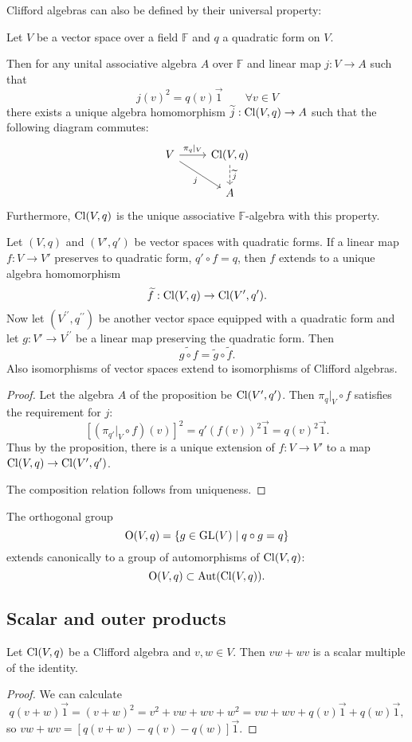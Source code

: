 Clifford algebras can also be defined by their universal property:
\begin{proposition} \label{CliffordUniversalProperty}
Let $V$ be a vector space over a field $\mathbb{F}$ and $q$ a quadratic form on $V$. 

Then for any unital associative algebra $A$ over $\mathbb{F}$ and linear map $j: V \to A$ such that
\[ j(v)^2 = q (v) \vec{1} \qquad \forall v\in V \]
there exists a unique algebra homomorphism $\widetilde{j}: \operatorname{Cl}(V,q)\to A$ such that the following diagram commutes:
\[ \begin{tikzcd}
V \rar{\pi_q|_V} \ar[dr, swap, "{j}"] & \Cl(V,q) \dar[dashed]{\widetilde{j}} \\
 & A
\end{tikzcd} \]
Furthermore, $\operatorname{Cl}(V,q)$ is the unique associative $\mathbb{F}$-algebra with this property.
\end{proposition}
\begin{corollary}
Let $(V,q)$ and $(V',q')$ be vector spaces with quadratic forms. If a linear map $f:V\to V'$ preserves to quadratic form, $q'\circ f = q$, then $f$ extends to a unique algebra homomorphism
\[ \widetilde{f}: \operatorname{Cl}(V,q) \to \operatorname{Cl}(V',q'). \]
Now let $(V^{\prime\prime},q^{\prime\prime})$ be another vector space equipped with a quadratic form and let $g: V'\to V^{\prime\prime}$ be a linear map preserving the quadratic form. Then
\[ \widetilde{g\circ f} = \widetilde{g}\circ\widetilde{f}. \]
Also isomorphisms of vector spaces extend to isomorphisms of Clifford algebras.
\end{corollary}
\begin{proof}
Let the algebra $A$ of the proposition be $\operatorname{Cl}(V',q')$. Then $\pi_q|_V\circ f$ satisfies the requirement for $j$:
\[ [(\pi_{q'}|_V\circ f)(v)]^2 = q'(f(v))^2 \vec{1} = q(v)^2\vec{1}. \]
Thus by the proposition, there is a unique extension of $f:V\to V'$ to a map $\operatorname{Cl}(V,q) \to \operatorname{Cl}(V',q')$.

The composition relation follows from uniqueness.
\end{proof}
\begin{corollary} \label{qOrthogonalMaps}
The orthogonal group
\[ \operatorname{O}(V,q) = \left\{ g\in\operatorname{GL}(V) \;\middle|\; q\circ g = q \right\} \]
extends canonically to a group of automorphisms of $\operatorname{Cl}(V,q)$:
\[ \operatorname{O}(V,q) \subset \operatorname{Aut}(\operatorname{Cl}(V,q)). \]
\end{corollary}


\subsection{Scalar and outer products}
\begin{lemma}
Let $\operatorname{Cl}(V,q)$ be a Clifford algebra and $v,w\in V$. Then $vw + wv$ is a scalar multiple of the identity.
\end{lemma}
\begin{proof}
We can calculate
\[ q(v+w)\vec{1} = (v+w)^2 = v^2 + vw + wv + w^2 = vw + wv + q(v)\vec{1} + q(w)\vec{1}, \]
so $vw+wv = [q(v+w)-q(v)-q(w)]\vec{1}$.
\end{proof}

